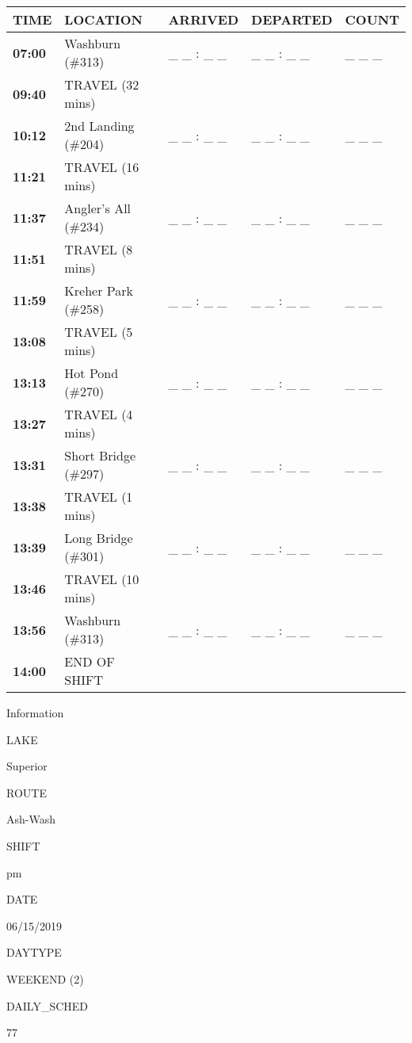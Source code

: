 \documentclass[]{article}
\begin{document}
\begin{tabular}{>{\bfseries}lllll}
\toprule
\textbf{TIME} & \textbf{LOCATION} & \textbf{ARRIVED} & \textbf{DEPARTED} & \textbf{COUNT}\\
\midrule
07:00 & Washburn (\#313) & \_ \_ : \_ \_ & \_ \_ : \_ \_ & \_ \_ \_\\
09:40 & TRAVEL (32 mins) &  &  & \\
10:12 & 2nd Landing (\#204) & \_ \_ : \_ \_ & \_ \_ : \_ \_ & \_ \_ \_\\
11:21 & TRAVEL (16 mins) &  &  & \\
11:37 & Angler's All (\#234) & \_ \_ : \_ \_ & \_ \_ : \_ \_ & \_ \_ \_\\
11:51 & TRAVEL (8 mins) &  &  & \\
11:59 & Kreher Park (\#258) & \_ \_ : \_ \_ & \_ \_ : \_ \_ & \_ \_ \_\\
13:08 & TRAVEL (5 mins) &  &  & \\
13:13 & Hot Pond (\#270) & \_ \_ : \_ \_ & \_ \_ : \_ \_ & \_ \_ \_\\
13:27 & TRAVEL (4 mins) &  &  & \\
13:31 & Short Bridge (\#297) & \_ \_ : \_ \_ & \_ \_ : \_ \_ & \_ \_ \_\\
13:38 & TRAVEL (1 mins) &  &  & \\
13:39 & Long Bridge (\#301) & \_ \_ : \_ \_ & \_ \_ : \_ \_ & \_ \_ \_\\
13:46 & TRAVEL (10 mins) &  &  & \\
13:56 & Washburn (\#313) & \_ \_ : \_ \_ & \_ \_ : \_ \_ & \_ \_ \_\\
14:00 & END OF SHIFT &  &  & \\
\bottomrule
\end{tabular}\newpage

Information

LAKE

Superior

ROUTE

Ash-Wash

SHIFT

pm

DATE

06/15/2019

DAYTYPE

WEEKEND (2)

DAILY\_SCHED

77

\vspace{24pt}
\end{document}
